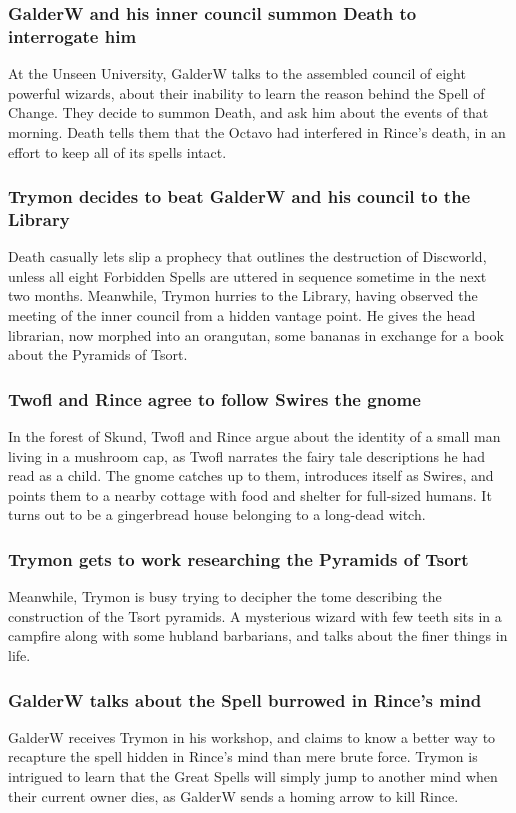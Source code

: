 \subsubsection{\Gls{GalderW} and his inner council summon \Gls{Death} to interrogate him}
At the Unseen University, \Gls{GalderW} talks to the assembled council of eight powerful wizards,
about their inability to learn the reason behind the Spell of Change. They decide to summon
\Gls{Death}, and ask him about the events of that morning. \Gls{Death} tells them that the Octavo
had interfered in \Gls{Rince}'s death, in an effort to keep all of its spells intact.

\subsubsection{\Gls{Trymon} decides to beat \Gls{GalderW} and his council to the Library}
\Gls{Death} casually lets slip a prophecy that outlines the destruction of Discworld, unless all
eight Forbidden Spells are uttered in sequence sometime in the next two months. Meanwhile,
\Gls{Trymon} hurries to the Library, having observed the meeting of the inner council from a hidden
vantage point. He gives the head librarian, now morphed into an orangutan, some bananas in exchange
for a book about the Pyramids of Tsort.

\subsubsection{\Gls{Twofl} and \Gls{Rince} agree to follow \Gls{Swires} the gnome}
In the forest of Skund, \Gls{Twofl} and \Gls{Rince} argue about the identity of a small man living
in a mushroom cap, as \Gls{Twofl} narrates the fairy tale descriptions he had read as a child.
The gnome catches up to them, introduces itself as \Gls{Swires}, and points them to a nearby cottage
with food and shelter for full-sized humans. It turns out to be a gingerbread house belonging to a
long-dead witch.

\subsubsection{\Gls{Trymon} gets to work researching the Pyramids of Tsort}
Meanwhile, \Gls{Trymon} is busy trying to decipher the tome describing the construction of the Tsort
pyramids. A mysterious wizard with few teeth sits in a campfire along with some hubland barbarians,
and talks about the finer things in life.

\subsubsection{\Gls{GalderW} talks about the Spell burrowed in \Gls{Rince}'s mind}
\Gls{GalderW} receives \Gls{Trymon} in his workshop, and claims to know a better way to recapture
the spell hidden in \Gls{Rince}'s mind than mere brute force. \Gls{Trymon} is intrigued to learn
that the Great Spells will simply jump to another mind when their current owner dies, as
\Gls{GalderW} sends a homing arrow to kill \Gls{Rince}.

